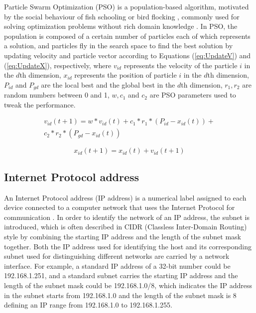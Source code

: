 \documentclass[conference]{IEEEtran}
\begin{document}
Particle Swarm Optimization (PSO) is a population-based algorithm, motivated by the social behaviour of fish schooling or bird flocking \cite{PSOIntro:Kennedy} \cite{PSOIntro:Eberhart}, commonly used for solving optimization problems without rich domain knowledge \cite{PSOIntro:Yanan}. In PSO, the population is composed of a certain number of particles each of which represents a solution, and particles fly in the search space to find the best solution by updating velocity and particle vector according to Equations (\ref{eq:UpdateV}) and (\ref{eq:UpdateX}), respectively, where $v_{id}$ represents the velocity of the particle $i$ in the $d$th dimension, $x_{id}$ represents the position of particle $i$ in the $d$th dimension, $P_{id}$ and $P_{gd}$ are the local best and the global best in the $d$th dimension, $r_{1}, r_{2}$ are random numbers between 0 and 1, $w, c_{1}$ and $c_{2}$ are PSO parameters used to tweak the performance.

\begin{equation}\label{eq:UpdateV}
	\begin{aligned}
	v_{id}(t+1) = w * v_{id}(t) + c_{1} * r_{1} * (P_{id} - x_{id}(t)) + \\
	c_{2} * r_{2} * (P_{gd} - x_{id}(t))
	\end{aligned}
\end{equation}

\begin{equation}\label{eq:UpdateX}
	x_{id}(t+1) = x_{id}(t) + v_{id}(t+1)
\end{equation}

\subsection{Internet Protocol address}\label{sec:IPAddress}

An Internet Protocol address (IP address) is a numerical label assigned to each device connected to a computer network that uses the Internet Protocol for communication \cite{IP:Postel}. In order to identify the network of an IP address, the subnet is introduced, which is often described in CIDR (Classless Inter-Domain Routing) style \cite{CIDR:Fuller} by combining the starting IP address and the length of the subnet mask together. Both the IP address used for identifying the host and its corresponding subnet used for distinguishing different networks are carried by a network interface. For example, a standard IP address of a 32-bit number could be 192.168.1.251, and a standard subnet carries the starting IP address and the length of the subnet mask could be 192.168.1.0/8, which indicates the IP address in the subnet starts from 192.168.1.0 and the length of the subnet mask is 8 defining an IP range from 192.168.1.0 to 192.168.1.255.
\end{document}

